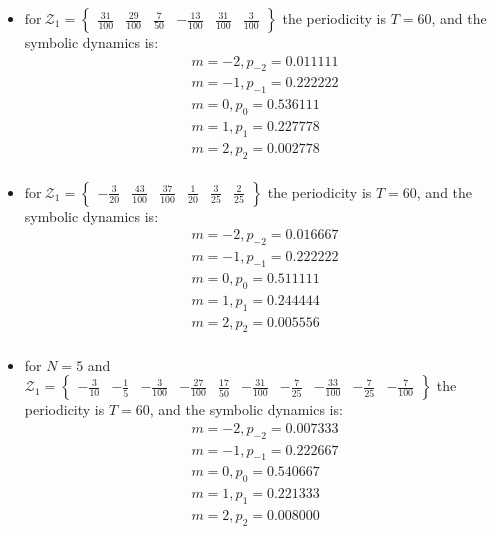 \begin{itemize}

\item
$
\text{for} \: \mathcal{Z}_1 = \left\{ \begin{array}{cccccc} \frac{31}{100} & \frac{29}{100} & \frac{7}{50} & - \frac{13}{100} & \frac{31}{100} & \frac{3}{100} \end{array}\right\}
$
\vskip 0.1in
the periodicity is $T = 60$, and the symbolic dynamics is:
\[
\begin{array}{c}
m = -2, p_{-2} = 0.011111 \\
m = -1, p_{-1} = 0.222222 \\
m = 0, p_{0} = 0.536111 \\
m = 1, p_{1} = 0.227778 \\
m = 2, p_{2} = 0.002778\\
\end{array}
\]

\item
$
\text{for} \: \mathcal{Z}_1 = \left\{\begin{array}{cccccc} - \frac{3}{20} & \frac{43}{100} & \frac{37}{100} & \frac{1}{20} & \frac{3}{25} & \frac{2}{25} \end{array}\right\}
$
\vskip 0.1in
the periodicity is $T = 60$, and the symbolic dynamics is:
\[
\begin{array}{c}
m = -2, p_{-2} = 0.016667 \\
m = -1, p_{-1} = 0.222222 \\
m = 0, p_{0} = 0.511111 \\
m = 1, p_{1} = 0.244444 \\
m = 2, p_{2} = 0.005556 \\
\end{array}
\]


\item
for $N = 5$ and $
\mathcal{Z}_1 = \left\{\begin{array}{cccccccccc} - \frac{3}{10} & - \frac{1}{5} & - \frac{3}{100} & - \frac{27}{100} & \frac{17}{50} & - \frac{31}{100} & - \frac{7}{25} & - \frac{33}{100} & - \frac{7}{25} & - \frac{7}{100} \end{array}\right\}
$
\vskip 0.1in
the periodicity is $T = 60$, and the symbolic dynamics is:
\[
\begin{array}{c}
m = -2, p_{-2} = 0.007333 \\
m = -1, p_{-1} = 0.222667 \\
m = 0, p_{0} = 0.540667 \\
m = 1, p_{1} = 0.221333 \\
m = 2, p_{2} = 0.008000 \\
\end{array}
\]



\end{itemize}
